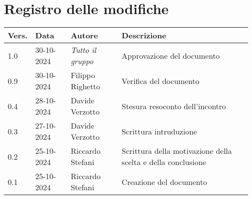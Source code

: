 \section*{Registro delle modifiche}

\begin{table}[h]
    \centering
    \begin{tabular}{|l|l|l|p{5cm}|}
        \hline
        \rowcolor[gray]{0.9}
        \textbf{Vers.} & \textbf{Data} & \textbf{Autore} & \textbf{Descrizione}\\
        \hline
        1.0 & 30-10-2024 & \emph{Tutto il gruppo} & Approvazione del documento\\
        \hline
        0.9 & 30-10-2024 & Filippo Righetto & Verifica del documento\\
        \hline
        0.4 & 28-10-2024 & Davide Verzotto & Stesura resoconto dell'incontro\\
        \hline
        0.3 & 27-10-2024 & Davide Verzotto & Scrittura intruduzione\\
        \hline
        0.2 & 25-10-2024 & Riccardo Stefani & Scrittura della motivazione della scelta e della conclusione\\
        \hline
        0.1 & 25-10-2024 & Riccardo Stefani & Creazione del documento\\
        \hline
    \end{tabular}
\end{table}
